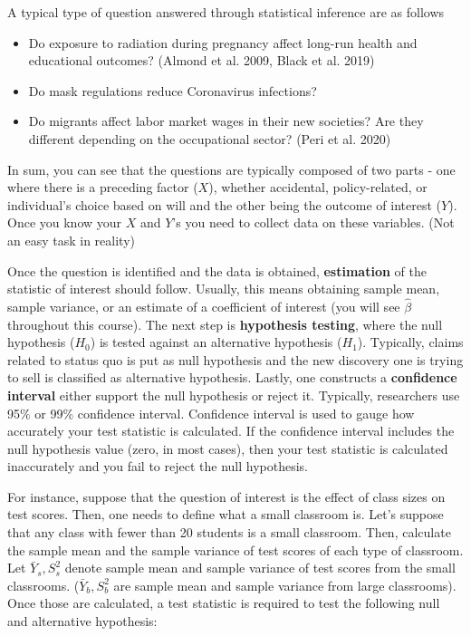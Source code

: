\documentclass[12pt]{article}
\theoremstyle{definition}
\theoremstyle{property}
\theoremstyle{assumption}
\theoremstyle{example}
\theoremstyle{comment}
\begin{document}
A typical type of question answered through statistical inference are as follows
\begin{itemize}
\item Do exposure to radiation during pregnancy affect long-run health and educational outcomes? (Almond et al. 2009, Black et al. 2019) 
\item Do mask regulations reduce Coronavirus infections?
\item Do migrants affect labor market wages in their new societies? Are they different depending on the occupational sector? (Peri et al. 2020)
\end{itemize}
In sum, you can see that the questions are typically composed of two parts - one where there is a preceding factor ($X$), whether accidental, policy-related, or individual's choice based on will and the other being the outcome of interest ($Y$). Once you know your $X$ and $Y$'s you need to collect data on these variables. (Not an easy task in reality)
\par
Once the question is identified and the data is obtained, \textbf{estimation} of the statistic of interest should follow. Usually, this means obtaining sample mean, sample variance, or an estimate of a coefficient of interest (you will see $\hat{\beta}$ throughout this course). The next step is \textbf{hypothesis testing}, where the null hypothesis ($H_0$) is tested against an alternative hypothesis ($H_1$). Typically, claims related to status quo is put as null hypothesis and the new discovery one is trying to sell is classified as alternative hypothesis. Lastly, one constructs a \textbf{confidence interval} either support the null hypothesis or reject it. Typically, researchers use 95\% or 99\% confidence interval. Confidence interval is used to gauge how accurately your test statistic is calculated. If the confidence interval includes the null hypothesis value (zero, in most cases), then your test statistic is calculated inaccurately and you fail to reject the null hypothesis. \par\medskip
For instance, suppose that the question of interest is the effect of class sizes on test scores. Then, one needs to define what a small classroom is. Let's suppose that any class with fewer than 20 students is a small classroom. Then, calculate the sample mean and the sample variance of test scores of each type of classroom. Let $\bar{Y}_s,S^2_s$ denote sample mean and sample variance of test scores from the small classrooms. ($\bar{Y}_b, S^2_b$ are sample mean and sample variance from large classrooms). Once those are calculated, a test statistic is required to test the following null and alternative hypothesis:
\end{document}
